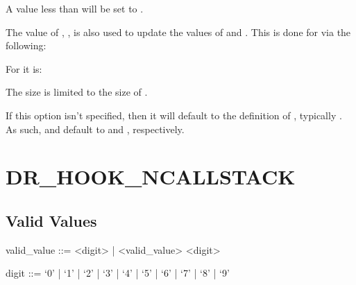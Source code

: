\documentclass[letterpaper,10pt,english]{sphinxmanual}
\begin{document}
\sphinxAtStartPar
A value less than  will be set to .

\begin{DUlineblock}{0em}
\item[] The value of , , is also used to update the values of  and . This is done for  via the following:
\item[] 
\item[] For  it is:
\item[] 
\end{DUlineblock}

\sphinxAtStartPar
The size is limited to the size of .

\sphinxAtStartPar
If this option isn’t specified, then it will default to the definition of , typically . As such,  and  default to  and , respectively.


\section{DR\_HOOK\_NCALLSTACK}
\label{\detokenize{flag/flag:dr-hook-ncallstack}}\label{\detokenize{flag/flag:id139}}

\subsection{Valid Values}
\label{\detokenize{flag/flag:id140}}
\begin{DUlineblock}{0em}
\item[] valid\_value ::= \textless{}digit\textgreater{} | \textless{}valid\_value\textgreater{} \textless{}digit\textgreater{}
\item[] digit ::= ‘0’ | ‘1’ | ‘2’ | ‘3’ | ‘4’ | ‘5’ | ‘6’ | ‘7’ | ‘8’ | ‘9’
\end{DUlineblock}
\end{document}
